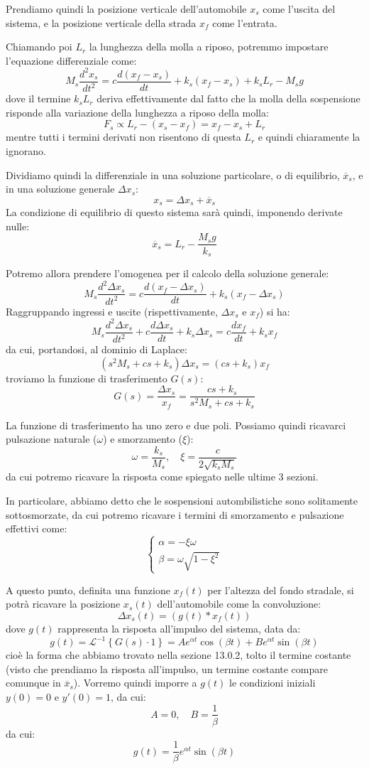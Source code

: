 \documentclass[a4paper,11pt]{article}
\begin{document}
\par\medskip

Prendiamo quindi la posizione verticale dell'automobile $x_s$ come l'uscita del sistema, e la posizione verticale della strada $x_f$ come l'entrata.

Chiamando poi $L_r$ la lunghezza della molla a riposo, potremmo impostare l'equazione differenziale come:
$$
M_s \frac{d^2 x_s}{dt^2} = c \frac{d ( x_f - x_s )}{dt} + k_s (x_f - x_s) + k_s L_r - M_s g
$$
dove il termine $k_s L_r$ deriva effettivamente dal fatto che la molla della sospensione risponde alla variazione della lunghezza a riposo della molla:
$$
F_s \propto  L_r - (x_s - x_f) = x_f - x_s + L_r
$$
mentre tutti i termini derivati non risentono di questa $L_r$ e quindi chiaramente la ignorano.

Dividiamo quindi la differenziale in una soluzione particolare, o di equilibrio, $\overline{x}_s$, e in una soluzione generale $\Delta x_s$:
$$
x_s = \Delta x_s + \overline{x}_s
$$
La condizione di equilibrio di questo sistema sarà quindi, imponendo derivate nulle:
$$
\overline{x}_s = L_r - \frac{M_s g}{k_s}
$$

Potremo allora prendere l'omogenea per il calcolo della soluzione generale:
$$
M_s \frac{d^2 \Delta x_s}{dt^2} = c \frac{d ( x_f - \Delta x_s )}{dt} + k_s (x_f - \Delta x_s)
$$
Raggruppando ingressi e uscite (rispettivamente, $\Delta x_s$ e $x_f$) si ha:
$$
M_s \frac{d^2 \Delta x_s}{dt^2} + c \frac{d \Delta x_s}{dt} + k_s \Delta x_s = c \frac{dx_f}{dt} + k_s x_f
$$
da cui, portandosi, al dominio di Laplace:
$$
\left( s^2 M_s + cs + k_s \right) \Delta x_s = ( cs + k_s ) x_f
$$
troviamo la funzione di trasferimento $G(s)$:
$$
G(s) = \frac{\Delta x_s}{x_f} = \frac{c s + k_s}{s^2 M_s + c s + k_s}
$$

La funzione di trasferimento ha uno zero e due poli.
Possiamo quindi ricavarci pulsazione naturale ($\omega$) e smorzamento ($\xi$):
$$
\omega = \frac{k_s}{M_s}, \quad \xi = \frac{c}{2 \sqrt{k_s M_s}}
$$
da cui potremo ricavare la risposta come spiegato nelle ultime 3 sezioni.

In particolare, abbiamo detto che le sospensioni autombilistiche sono solitamente sottosmorzate, da cui potremo ricavare i termini di smorzamento e pulsazione effettivi come:
\[
	\begin{cases}
		\alpha = -\xi \omega\\
		\beta = \omega \sqrt{1 - \xi^2}
	\end{cases}
\]

A questo punto, definita una funzione $x_f(t)$ per l'altezza del fondo stradale, si potrà ricavare la posizione $x_s(t)$ dell'automobile come la convoluzione:
$$
\Delta x_s(t) = ( g(t) * x_f(t) )
$$
dove $g(t)$ rappresenta la risposta all'impulso del sistema, data da:
$$
g(t) = \mathcal{L}^{-1} \left\{ G(s) \cdot 1 \right\} = A e^{\alpha t} \cos(\beta t) + B e^{\alpha t} \sin(\beta t)
$$
cioè la forma che abbiamo trovato nella sezione 13.0.2, tolto il termine costante (visto che prendiamo la risposta all'impulso, un termine costante compare comunque in $\overline{x}_s$).
Vorremo quindi imporre a $g(t)$ le condizioni iniziali $y(0) = 0$ e $y'(0) = 1$, da cui:
$$
A = 0, \quad B = \frac{1}{\beta}
$$
da cui:
$$
g(t) = \frac{1}{\beta} e^{\alpha t} \sin(\beta t)
$$
\end{document}
